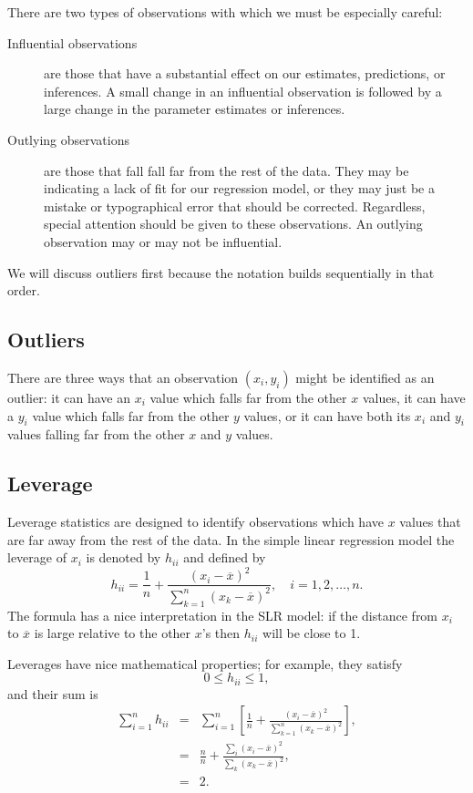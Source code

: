 \documentclass[captions=tableheading]{scrbook}
\begin{document}
There are two types of observations with which we must be especially careful:
\begin{description}
\item[Influential observations] are those that have a substantial effect on our estimates, predictions, or inferences. A small change in an influential observation is followed by a large change in the parameter estimates or inferences.
\item[Outlying observations] are those that fall fall far from the rest of the data. They may be indicating a lack of fit for our regression model, or they may just be a mistake or typographical error that should be corrected. Regardless, special attention should be given to these observations. An outlying observation may or may not be influential.
\end{description}

We will discuss outliers first because the notation builds sequentially in that order.
\subsection{Outliers}
\label{sec-1-5-1}

There are three ways that an observation \((x_{i},y_{i})\) might be identified as an  outlier: it can have an \(x_{i}\) value which falls far from the other  \(x\) values, it can have a \(y_{i}\) value which falls far from the other \(y\) values, or it can have both its \(x_{i}\) and \(y_{i}\) values falling far from the other \(x\) and \(y\) values.
\subsection{Leverage}
\label{sec-1-5-2}

Leverage statistics are designed to identify observations which have \(x\) values that are far away from the rest of the data. In the simple linear regression model the leverage of \(x_{i}\) is denoted by \(h_{ii}\) and defined by 
\begin{equation}
h_{ii}=\frac{1}{n}+\frac{(x_{i}-\overline{x})^{2}}{\sum_{k=1}^{n}(x_{k}-\overline{x})^{2}},\quad i=1,2,\ldots,n.
\end{equation}
The formula has a nice interpretation in the SLR model: if the distance from \(x_{i}\) to \(\overline{x}\) is large relative to the other \(x\)'s then \(h_{ii}\) will be close to 1. 

Leverages have nice mathematical properties; for example, they satisfy
\begin{equation}
0\leq h_{ii}\leq1,\label{eq:slr-leverage-between}
\end{equation}
and their sum is
\begin{eqnarray}
\sum_{i=1}^{n}h_{ii} & = & \sum_{i=1}^{n}\left[\frac{1}{n}+\frac{(x_{i}-\overline{x})^{2}}{\sum_{k=1}^{n}(x_{k}-\overline{x})^{2}}\right],\\
 & = & \frac{n}{n}+\frac{\sum_{i}(x_{i}-\overline{x})^{2}}{\sum_{k}(x_{k}-\overline{x})^{2}},\\
 & = & 2.\label{eq:slr-average-leverage}
\end{eqnarray}
\end{document}
